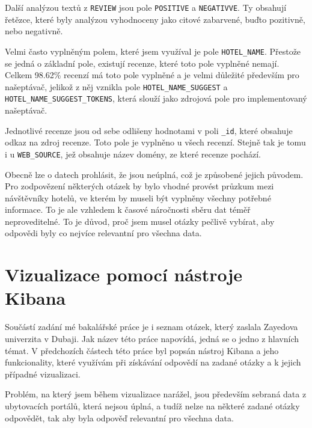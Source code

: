 \documentclass[czech,BP]{thesiskiv}
\begin{document}
Další analýzou textů z \texttt{REVIEW} jsou pole \texttt{POSITIVE} a \texttt{NEGATIVVE}. Ty obsahují řetězce, které byly analýzou vyhodnoceny jako citové zabarvené, buďto pozitivně, nebo negativně.


Velmi často vyplněným polem, které jsem využíval je pole \texttt{HOTEL\_NAME}. Přestože se jedná o základní pole, existují recenze, které toto pole vyplněné nemají. Celkem 98.62\% recenzí má toto pole vyplněné a je velmi důležité především pro našeptávač, jelikož z něj vznikla pole \texttt{HOTEL\_NAME\_SUGGEST} a \texttt{HOTEL\_NAME\_SUGGEST\_TOKENS}, která slouží jako zdrojová pole pro implementovaný našeptávač.

Jednotlivé recenze jsou od sebe odlišeny hodnotami v poli \texttt{\_id}, které obsahuje odkaz na zdroj recenze. Toto pole je vyplněno u všech recenzí. Stejně tak je tomu i u \texttt{WEB\_SOURCE}, jež obsahuje název domény, ze které recenze pochází.


Obecně lze o datech prohlásit, že jsou neúplná, což je způsobené jejich původem. Pro zodpovězení některých otázek by bylo vhodné provést průzkum mezi návštěvníky hotelů, ve kterém by museli být vyplněny všechny potřebné informace. To je ale vzhledem k časové náročnosti sběru dat téměř neproveditelné. To je důvod, proč jsem musel otázky pečlivě vybírat, aby odpovědi byly co nejvíce relevantní pro všechna data.

\chapter{Vizualizace pomocí nástroje Kibana}
\label{Vizualizace}
Součástí zadání mé bakalářské práce je i seznam otázek, který zaslala Zayedova univerzita v Dubaji. Jak název této práce napovídá, jedná se o jedno z hlavních témat. V předchozích částech této práce byl popsán nástroj Kibana a jeho funkcionality, které využívám při získávání odpovědí na zadané otázky a k jejich případné vizualizaci.


Problém, na který jsem během vizualizace narážel, jsou především sebraná data z ubytovacích portálů, která nejsou úplná, a tudíž nelze na některé zadané otázky odpovědět, tak aby byla odpověď relevantní pro všechna data.
\end{document}

